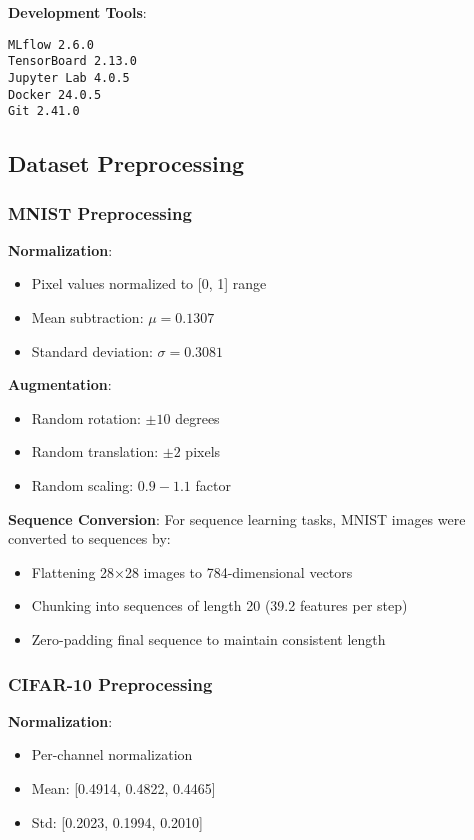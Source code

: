 \textbf{Development Tools}:
\begin{verbatim}
MLflow 2.6.0
TensorBoard 2.13.0
Jupyter Lab 4.0.5
Docker 24.0.5
Git 2.41.0
\end{verbatim}

\subsection{Dataset Preprocessing}

\subsubsection{MNIST Preprocessing}

\textbf{Normalization}:
\begin{itemize}
    \item Pixel values normalized to [0, 1] range
    \item Mean subtraction: $\mu = 0.1307$
    \item Standard deviation: $\sigma = 0.3081$
\end{itemize}

\textbf{Augmentation}:
\begin{itemize}
    \item Random rotation: $\pm 10$ degrees
    \item Random translation: $\pm 2$ pixels
    \item Random scaling: $0.9 - 1.1$ factor
\end{itemize}

\textbf{Sequence Conversion}:
For sequence learning tasks, MNIST images were converted to sequences by:
\begin{itemize}
    \item Flattening 28×28 images to 784-dimensional vectors
    \item Chunking into sequences of length 20 (39.2 features per step)
    \item Zero-padding final sequence to maintain consistent length
\end{itemize}

\subsubsection{CIFAR-10 Preprocessing}

\textbf{Normalization}:
\begin{itemize}
    \item Per-channel normalization
    \item Mean: [0.4914, 0.4822, 0.4465]
    \item Std: [0.2023, 0.1994, 0.2010]
\end{itemize}

